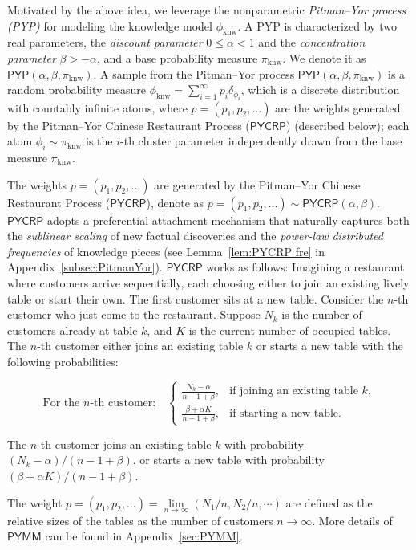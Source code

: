 \documentclass[11pt]{article}
\theoremstyle{plain}
\theoremstyle{definition}
\newcommand{\knwModel}{\phi_{\text{knw}}}
\newcommand{\PYP}{\mathsf{PYP}}
\newcommand{\PYMM}{\mathsf{PYMM}}
\newcommand{\PYCRP}{\mathsf{PYCRP}}
\newcommand{\basemeasure}{\pi_{\text{knw}}}
\begin{document}
Motivated by the above idea, we leverage the nonparametric {\em Pitman–Yor process (PYP)} \citep{pitman1997two} for modeling the knowledge model $\knwModel$. A PYP is characterized by two real parameters, the {\em discount parameter} \(0 \leq \alpha < 1\) and the {\em concentration parameter} \(\beta > -\alpha\), and a base probability measure $\basemeasure$. 
We denote it as $\PYP(\alpha, \beta, \basemeasure)$.
A sample from the Pitman–Yor process \( \PYP(\alpha, \beta, \basemeasure) \) is a  random probability measure \( \knwModel = \sum_{i=1}^{\infty} p_i \delta_{\phi_i} \),  
which is a discrete distribution with countably infinite atoms,
where \( p = (p_1, p_2, \ldots) \) are the weights generated by the Pitman–Yor Chinese Restaurant Process ($\PYCRP$) (described below);
each atom \( \phi_i \sim \basemeasure \) is the  $i$-th cluster parameter independently drawn from the base measure \( \basemeasure \).

The weights $p = (p_1, p_2, \ldots)$ 
are generated by the Pitman–Yor Chinese Restaurant Process ($\PYCRP$), denote as \( p = (p_1, p_2, \ldots) \sim \PYCRP(\alpha, \beta) \).
$\PYCRP$ adopts a preferential attachment mechanism that 
naturally captures both the {\em sublinear scaling} of new factual discoveries and the {\em power-law distributed frequencies} of knowledge pieces (see Lemma~\ref{lem:PYCRP fre} in Appendix~\ref{subsec:PitmanYor}). 
$\PYCRP$ works as follows:
Imagining a restaurant where customers arrive sequentially, each choosing either to join an existing lively table or start their own.
The first customer sits at a new table.
Consider the \( n \)-th customer who just come to the restaurant.
Suppose \( N_k \) is the number of customers already at table \( k \), and \( K \) is the current number of occupied tables.
The \( n \)-th customer either joins an existing table \(k\) or starts a new table with the following probabilities: 
\begin{arxiv}
\[
\text{For the \(n\)-th customer:} \quad
\begin{cases}
\displaystyle \frac{N_k - \alpha}{n - 1 + \beta}, & \text{if joining an existing table \(k\),}\\[10pt]
\displaystyle \frac{\beta + \alpha K}{n - 1 + \beta}, & \text{if starting a new table.}
\end{cases}
\]
\end{arxiv}
\begin{nips}
The \(n\)-th customer joins an existing table \(k\) with probability
 $(N_k - \alpha)/(n - 1 + \beta)$,
 or starts a new table with probability
 $(\beta + \alpha K)/(n - 1 + \beta)$.
\end{nips}
The weight 
$
p=(p_1, p_2, \dots)=\lim\limits_{n\to \infty}(N_1/n,N_2/n,\cdots)
$
are defined as the relative sizes of the tables as the number of customers \( n \to \infty \).  
More details of $\PYMM$ can be found in Appendix~\ref{sec:PYMM}.
\end{document}
